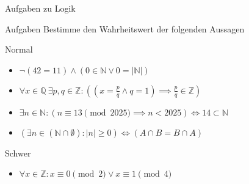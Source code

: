 %
%
%
%


{
\begin{frame}[fragile]{Aufgaben zu Logik}
    \begin{alertblock}{Aufgaben}
        Bestimme den Wahrheitswert der folgenden Aussagen
    \end{alertblock}
    \begin{block}{Normal}
        \begin{itemize}
            \item $\neg (42 = 11) \land (0\in \mathbb{N} \lor 0 = |\mathbb{N}|)$
            \item $\forall x \in \mathbb{Q}\ \exists p,q \in \mathbb{Z}: \left(\left(x = \frac{p}{q} \land q = 1\right) \implies \frac{p}{q}\in \mathbb{Z}\right)$
            \item $\exists n \in \mathbb{N}: (n \equiv 13 \pmod 2025 \implies n < 2025) \iff 14 \subset \mathbb{N}$
            \item $(\exists n \in (\mathbb{N} \cap \emptyset): |n| \geq 0) \iff (A\cap B = B\cap A)$
        \end{itemize}
    \end{block}
    \begin{block}{Schwer}
        \begin{itemize}
            \item $\forall x \in \mathbb{Z}: x \equiv 0 \pmod{2} \vee x \equiv 1 \pmod{4}$
        \end{itemize}
    \end{block}
\end{frame}
}


